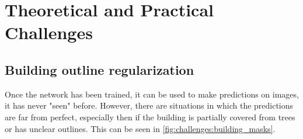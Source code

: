 
\chapter{Theoretical and Practical Challenges}

\section{Building outline regularization}
Once the network has been trained, it can be used to make predictions on images, it has never "seen" before. However, there are situations in which the predictions are far from perfect, especially then if the building is partially covered from trees or has unclear outlines. This can be seen in \autoref{fig:challenges:building_masks}.

